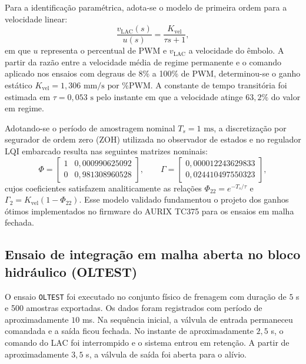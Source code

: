 Para a identificação paramétrica, adota-se o modelo de primeira ordem para a velocidade linear:
\begin{equation}
    \frac{v_{\mathrm{LAC}}(s)}{u(s)} = \frac{K_{\mathrm{vel}}}{\tau s + 1},
    \label{eq:ft_motor_lac}
\end{equation}
em que $u$ representa o percentual de PWM e $v_{\mathrm{LAC}}$ a velocidade do êmbolo. A partir da razão entre a velocidade média de regime permanente e o comando aplicado nos ensaios com degraus de 8\% a 100\% de PWM, determinou-se o ganho estático $K_{\mathrm{vel}} = 1{,}306\text{ mm/s por \%PWM}$. A constante de tempo transitória foi estimada em $\tau = 0{,}053\text{ s}$ pelo instante em que a velocidade atinge $63{,}2\%$ do valor em regime.

Adotando-se o período de amostragem nominal $T_s = 1\text{ ms}$, a discretização por segurador de ordem zero (ZOH) utilizada no observador de estados e no regulador LQI embarcado resulta nas seguintes matrizes nominais:
\begin{equation}
    \Phi = \begin{bmatrix}
        1 & 0{,}000990625092 \\
        0 & 0{,}981308960528
    \end{bmatrix}, \qquad
    \Gamma = \begin{bmatrix}
        0{,}000012243629833 \\
        0{,}024410497550323
    \end{bmatrix},
    \label{eq:matrizes_discretas_lac_nominal}
\end{equation}
cujos coeficientes satisfazem analiticamente as relações $\Phi_{22} = e^{-T_s/\tau}$ e $\Gamma_2 = K_{\mathrm{vel}}(1 - \Phi_{22})$. Esse modelo validado fundamentou o projeto dos ganhos ótimos implementados no firmware do AURIX TC375 para os ensaios em malha fechada.


\subsection{Ensaio de integração em malha aberta no bloco hidráulico (OLTEST)}
\label{sec:resultado-final-oltest}
O ensaio \texttt{OLTEST} foi executado no conjunto físico de frenagem com duração de $5$ s e 500 amostras exportadas. Os dados foram registrados com período de aproximadamente $10$ ms. Na sequência inicial, a válvula de entrada permaneceu comandada e a saída ficou fechada. No instante de aproximadamente $2{,}5$ s, o comando do LAC foi interrompido e o sistema entrou em retenção. A partir de aproximadamente $3{,}5$ s, a válvula de saída foi aberta para o alívio.

